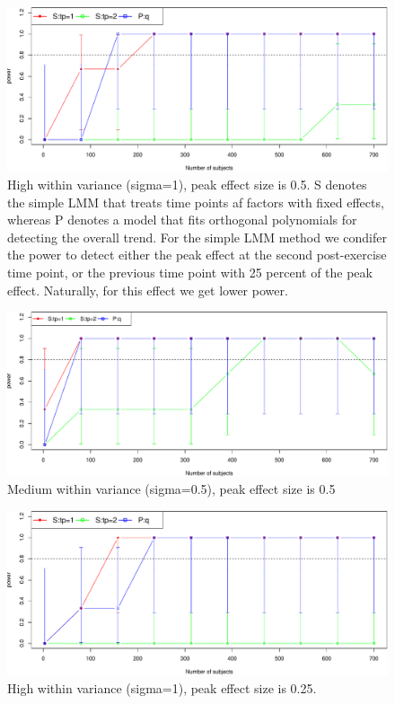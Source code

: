 \documentclass[]{article}
\begin{document}
\begin{figure}
\centering
\includegraphics{power_calculations_files/figure-latex/vhigheffects1-1.pdf}
\caption{High within variance (sigma=1), peak effect size is 0.5. S
denotes the simple LMM that treats time points af factors with fixed
effects, whereas P denotes a model that fits orthogonal polynomials for
detecting the overall trend. For the simple LMM method we condifer the
power to detect either the peak effect at the second post-exercise time
point, or the previous time point with 25 percent of the peak effect.
Naturally, for this effect we get lower power.}
\end{figure}

\begin{figure}
\centering
\includegraphics{power_calculations_files/figure-latex/vhigheffects2-1.pdf}
\caption{Medium within variance (sigma=0.5), peak effect size is 0.5}
\end{figure}

\begin{figure}
\centering
\includegraphics{power_calculations_files/figure-latex/higheffects1-1.pdf}
\caption{High within variance (sigma=1), peak effect size is 0.25.}
\end{figure}
\end{document}

